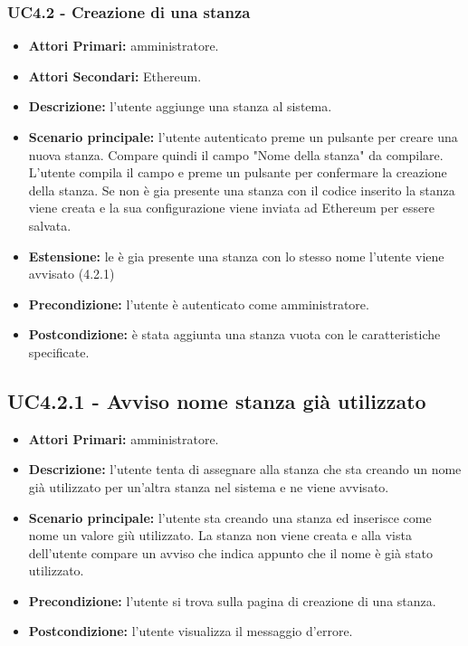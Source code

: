 \subsubsection{ UC4.2 - Creazione di una stanza}
\begin{itemize}
	\item\textbf{Attori Primari:}
	amministratore.
	\item\textbf{Attori Secondari:}
	Ethereum.
	\item\textbf{Descrizione:} 
	l'utente aggiunge una stanza al sistema.
	\item\textbf{Scenario principale:} 
	l'utente autenticato preme un pulsante per creare una nuova stanza. Compare quindi il campo "Nome della stanza" da compilare.
	L'utente compila il campo e preme un pulsante per confermare la creazione della stanza.
	Se non è gia presente una stanza con il codice inserito la stanza viene creata e la sua configurazione viene inviata ad Ethereum per essere salvata.
	\item\textbf{Estensione:}
	le è gia presente una stanza con lo stesso nome l'utente viene avvisato (4.2.1)
	\item\textbf{Precondizione:} 
	l'utente è autenticato come amministratore.
	\item\textbf{Postcondizione:}
	è stata aggiunta una stanza vuota con le caratteristiche specificate.
\end{itemize}

\subsection{ UC4.2.1 - Avviso nome stanza già utilizzato}
\begin{itemize}
	\item\textbf{Attori Primari:}
	amministratore.
	\item\textbf{Descrizione:}
	l'utente tenta di assegnare alla stanza che sta creando un nome già utilizzato per un'altra stanza nel sistema e ne viene avvisato.
	\item\textbf{Scenario principale:}
	l'utente sta creando una stanza ed inserisce come nome un valore giù utilizzato.
	La stanza non viene creata e alla vista dell'utente compare un avviso che indica appunto che il nome è già stato utilizzato.
	\item\textbf{Precondizione:}
	l'utente si trova sulla pagina di creazione di una stanza.
	\item\textbf{Postcondizione:}
	l'utente visualizza il messaggio d'errore.
\end{itemize}

